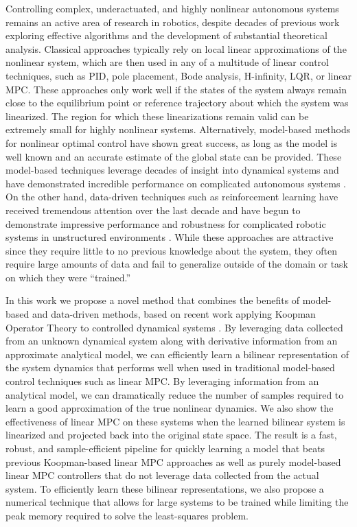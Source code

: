 \documentclass{article}
\begin{document}
Controlling complex, underactuated, and highly nonlinear autonomous systems remains an
active area of research in robotics, despite decades of previous work exploring
effective algorithms and the development of substantial theoretical analysis. Classical
approaches typically rely on local linear approximations of the nonlinear system, which
are then used in any of a multitude of linear control techniques, such as PID, pole
placement, Bode analysis, H-infinity, LQR, or linear MPC.  These approaches only work
well if the states of the system always remain close to the equilibrium point or
reference trajectory about which the system was linearized. The region for which these
linearizations remain valid can be extremely small for highly nonlinear systems.
Alternatively, model-based methods for nonlinear optimal control have shown great
success, as long as the model is well known and an accurate estimate of the global state
can be provided. These model-based techniques leverage decades of insight into
dynamical systems and have demonstrated incredible performance on complicated
autonomous systems 
\cite{Farshidian2017,Kuindersma2014,Bjelonic2021,Subosits2019} .  On the
other hand, data-driven techniques such as reinforcement learning have received
tremendous attention over the last decade and have begun to demonstrate impressive
performance and robustness for complicated robotic systems in unstructured environments
\cite{Karnchanachari2020,Hoeller2020,Li2021}. While these approaches are attractive
since they require little to no previous knowledge about the system, they often require
large amounts of data and fail to generalize outside of the domain or task on which they
were ``trained.''

In this work we propose a novel method that combines the benefits of model-based and
data-driven methods, based on recent work  applying Koopman Operator Theory to
controlled dynamical systems 
\cite{Meduri2022,Bruder2021,Korda2018,Folkestad2020,Suh2020}.
By leveraging data collected from an
unknown dynamical system along with derivative information from an approximate
analytical model, we can efficiently learn a bilinear representation of the system
dynamics that performs well when used in traditional model-based control techniques such
as linear MPC. By leveraging information from an analytical model, we can dramatically
reduce the number of samples required to learn a good approximation of the true
nonlinear dynamics. We also show the effectiveness of linear MPC on these systems 
when the learned bilinear system is linearized and projected back into the original 
state space. The result is a fast, robust, and sample-efficient pipeline for quickly 
learning a model that beats previous Koopman-based linear MPC approaches as well as 
purely model-based linear MPC controllers that do not leverage data collected from the 
actual system. To efficiently learn these bilinear representations, we also propose 
a numerical technique that allows for large systems to be trained while limiting the 
peak memory required to solve the least-squares problem.
\end{document}
